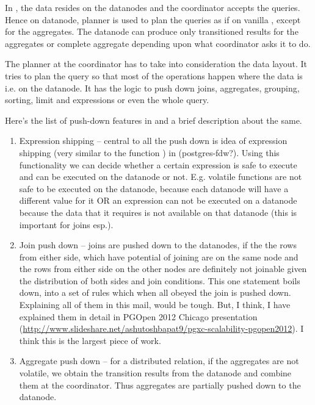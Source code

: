 	In \XC, the data resides on the datanodes and the coordinator accepts the queries.
	Hence on datanode, \PG{} planner is used to plan the queries as if on vanilla
	\PG, except for the aggregates.
	The datanode can produce only transitioned results for the aggregates or complete
	aggregate depending upon what coordinator asks it to do.

	The planner at the coordinator has to take into consideration the data layout.
	It tries to plan the query so that most of the operations happen where the data
	is i.e.{} on the datanode.
	It has the logic to push down joins, aggregates, grouping, sorting, limit and
	expressions or even the whole query. 

	Here's the list of push-down features in \XC{} and a brief description about the same.

	\begin{enumerate}
		\item Expression shipping -- central to all the push down is idea of expression
			  shipping (very similar to the function ) in
			  \PG{} (postgres-fdw?).
			  Using this functionality we can decide whether a certain expression is safe
			  to execute and can be executed on the datanode or not.
			  E.g.{} volatile functions are not safe to be executed on the datanode,
			  because each datanode will have a different value for it OR an expression
			  can not be executed on a datanode because the data that it requires is not
			  available on that datanode (this is important for joins esp.).
		\item Join push down -- joins are pushed down to the datanodes, if the the rows
			  from either side, which have potential of joining are on the same node
			  and the rows from either side on the other nodes are definitely not joinable
			  given the distribution of both sides and join conditions.
			  This one statement boils down, into a set of rules which when all obeyed
			  the join is pushed down.
			  Explaining all of them in this mail, would be tough.
			  But, I think, I have explained them in detail in PGOpen 2012 Chicago presentation
			  (\url{http://www.slideshare.net/ashutoshbapat9/pgxc-scalability-pgopen2012}).
			  I think this is the largest piece of work.
		\item Aggregate push down -- for a distributed relation, if the aggregates are not
			  volatile, we obtain the transition results from the datanode and combine them
			  at the coordinator.
			  Thus aggregates are partially pushed down to the datanode.

\end{enumerate}
